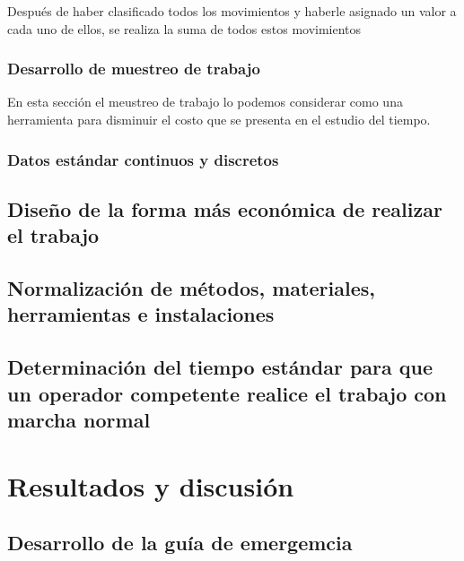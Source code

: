     Después de haber clasificado todos los movimientos y haberle asignado un valor a cada uno de ellos, se realiza la suma de todos estos movimientos
        
    \subsubsection{Desarrollo de muestreo de trabajo}
    En esta sección el meustreo de trabajo lo podemos considerar como una herramienta para disminuir el costo que se presenta en el estudio del tiempo. 
    
    \subsubsection{Datos estándar continuos y discretos}
    \subsection{Diseño de la forma más económica de realizar el trabajo}
    \subsection{Normalización de métodos, materiales, herramientas e instalaciones}
    \subsection{Determinación del tiempo estándar para que un operador competente realice el trabajo con marcha normal}
    
    
    
    
    

    


    
    \section{Resultados y discusión}
    \subsection{Desarrollo de la guía de emergemcia}
    
